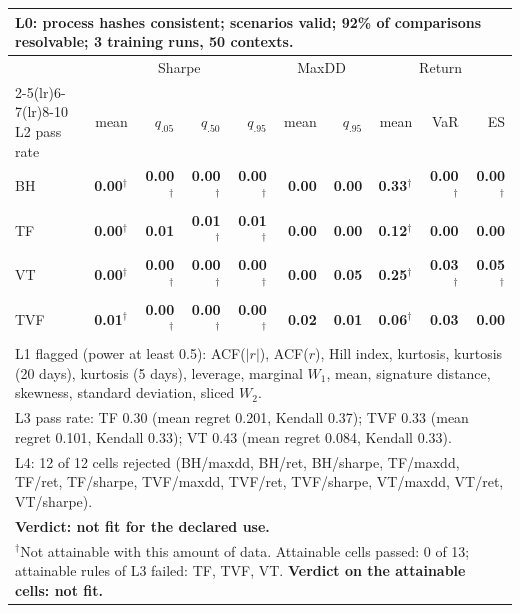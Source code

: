 \begin{tabular}{lrrrrrrrrr}
\toprule
\multicolumn{10}{p{13.5cm}}{L0: process hashes consistent; scenarios valid; 92\% of comparisons resolvable; 3 training runs, 50 contexts.} \\
\midrule
 & \multicolumn{4}{c}{Sharpe} & \multicolumn{2}{c}{MaxDD} & \multicolumn{3}{c}{Return} \\
\cmidrule(lr){2-5}\cmidrule(lr){6-7}\cmidrule(lr){8-10}
L2 pass rate & mean & $q_{.05}$ & $q_{.50}$ & $q_{.95}$ & mean & $q_{.95}$ & mean & VaR & ES \\
\midrule
BH & \textbf{0.00}$^{\dagger}$ & \textbf{0.00}$^{\dagger}$ & \textbf{0.00}$^{\dagger}$ & \textbf{0.00}$^{\dagger}$ & \textbf{0.00} & \textbf{0.00} & \textbf{0.33}$^{\dagger}$ & \textbf{0.00}$^{\dagger}$ & \textbf{0.00}$^{\dagger}$ \\
TF & \textbf{0.00}$^{\dagger}$ & \textbf{0.01} & \textbf{0.01}$^{\dagger}$ & \textbf{0.01}$^{\dagger}$ & \textbf{0.00} & \textbf{0.00} & \textbf{0.12}$^{\dagger}$ & \textbf{0.00} & \textbf{0.00} \\
VT & \textbf{0.00}$^{\dagger}$ & \textbf{0.00}$^{\dagger}$ & \textbf{0.00}$^{\dagger}$ & \textbf{0.00}$^{\dagger}$ & \textbf{0.00} & \textbf{0.05} & \textbf{0.25}$^{\dagger}$ & \textbf{0.03}$^{\dagger}$ & \textbf{0.05}$^{\dagger}$ \\
TVF & \textbf{0.01}$^{\dagger}$ & \textbf{0.00}$^{\dagger}$ & \textbf{0.00}$^{\dagger}$ & \textbf{0.00}$^{\dagger}$ & \textbf{0.02} & \textbf{0.01} & \textbf{0.06}$^{\dagger}$ & \textbf{0.03} & \textbf{0.00} \\
\midrule
\multicolumn{10}{p{13.5cm}}{L1 flagged (power at least 0.5): ACF($|r|$), ACF($r$), Hill index, kurtosis, kurtosis (20 days), kurtosis (5 days), leverage, marginal $W_1$, mean, signature distance, skewness, standard deviation, sliced $W_2$.} \\
\multicolumn{10}{p{13.5cm}}{L3 pass rate: TF 0.30 (mean regret 0.201, Kendall 0.37); TVF 0.33 (mean regret 0.101, Kendall 0.33); VT 0.43 (mean regret 0.084, Kendall 0.33).} \\
\multicolumn{10}{p{13.5cm}}{L4: 12 of 12 cells rejected (BH/maxdd, BH/ret, BH/sharpe, TF/maxdd, TF/ret, TF/sharpe, TVF/maxdd, TVF/ret, TVF/sharpe, VT/maxdd, VT/ret, VT/sharpe).} \\
\multicolumn{10}{p{13.5cm}}{\textbf{Verdict: not fit for the declared use.}} \\
\multicolumn{10}{p{13.5cm}}{$^{\dagger}$Not attainable with this amount of data. Attainable cells passed: 0 of 13; attainable rules of L3 failed: TF, TVF, VT. \textbf{Verdict on the attainable cells: not fit.}} \\
\bottomrule
\end{tabular}
